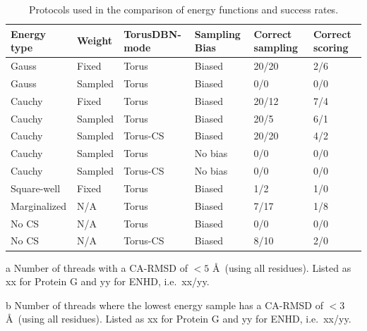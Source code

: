 \begin{table}[h]
    \caption{Protocols used in the comparison of energy functions and success rates.}
    \begin{center}
    \begin{threeparttable}
    \begin{tabular}{l l l l l l}
Energy type & Weight  & TorusDBN-mode & Sampling Bias & Correct sampling\tnote{a} & Correct scoring\tnote{b}\\\hline
Gauss         & Fixed   & Torus       & Biased   & 20/20  & 2/6  \\
Gauss         & Sampled & Torus       & Biased   &  0/0   & 0/0  \\
Cauchy        & Fixed   & Torus       & Biased   & 20/12  & 7/4  \\
Cauchy        & Sampled & Torus       & Biased   & 20/5   & 6/1  \\
Cauchy        & Sampled & Torus-CS    & Biased   & 20/20  & 4/2  \\
Cauchy        & Sampled & Torus       & No bias  &  0/0   & 0/0  \\
Cauchy        & Sampled & Torus-CS    & No bias  &  0/0   & 0/0  \\
Square-well   & Fixed   & Torus       & Biased   &  1/2   & 1/0  \\
Marginalized  & N/A     & Torus       & Biased   &  7/17  & 1/8  \\
No CS         & N/A     & Torus       & Biased   &  0/0   & 0/0  \\
No CS         & N/A     & Torus-CS    & Biased   &  8/10  & 2/0
    \end{tabular}
    \begin{tablenotes}
        \item[a] Number of threads with a CA-RMSD of $<5$ \AA\ (using all residues). Listed as xx for Protein G and yy for ENHD, i.e.~xx/yy.\\
        \item[b] Number of threads where the lowest energy sample has a CA-RMSD of $<3$ \AA\ (using all residues). Listed as xx for Protein G and yy for ENHD, i.e.~xx/yy.\\
    \end{tablenotes}
    \end{threeparttable}
    \end{center}
    \label{tab:prior_folds}
\end{table}

